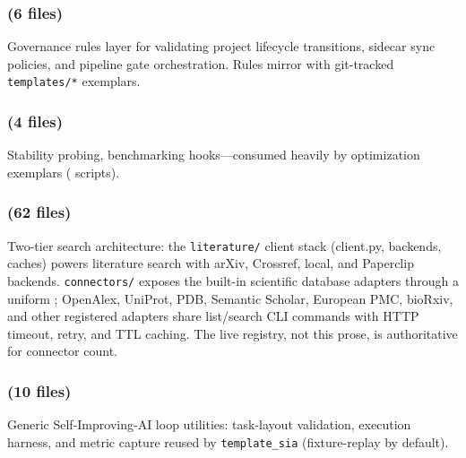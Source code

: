 \documentclass[
  english,
]{article}
\begin{document}
\subsubsection{\texorpdfstring{ (6
files)}{infrastructure.rules (6 files)}}\label{infrastructure.rules-6-files}

Governance rules layer for validating project lifecycle transitions,
sidecar sync policies, and pipeline gate orchestration. Rules mirror
 with git-tracked \texttt{templates/*}
exemplars.

\subsubsection{\texorpdfstring{ (4
files)}{infrastructure.scientific (4 files)}}\label{infrastructure.scientific-4-files}

Stability probing, benchmarking hooks---consumed heavily by optimization
exemplars ( scripts).

\subsubsection{\texorpdfstring{ (62
files)}{infrastructure.search (62 files)}}\label{infrastructure.search-62-files}

Two-tier search architecture: the \texttt{literature/} client stack
(client.py, backends, caches) powers literature search with arXiv,
Crossref, local, and Paperclip backends. \texttt{connectors/} exposes
the built-in scientific database adapters through a uniform
; OpenAlex, UniProt, PDB, Semantic Scholar,
European PMC, bioRxiv, and other registered adapters share list/search
CLI commands with HTTP timeout, retry, and TTL caching. The live
registry, not this prose, is authoritative for connector count.

\subsubsection{\texorpdfstring{ (10
files)}{infrastructure.sia (10 files)}}\label{infrastructure.sia-10-files}

Generic Self-Improving-AI loop utilities: task-layout validation,
execution harness, and metric capture reused by \texttt{template\_sia}
(fixture-replay by default).
\end{document}
